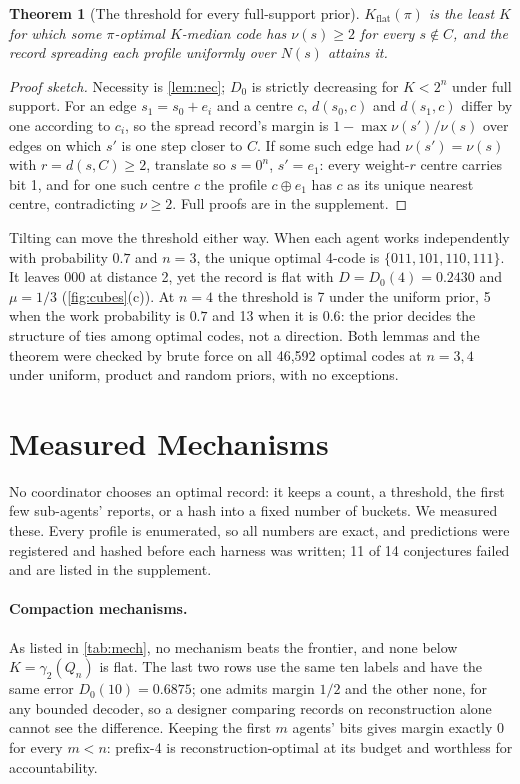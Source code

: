 \documentclass[sigconf,anonymous,acmthm=false]{acmart}
\theoremstyle{acmplain}
\newtheorem{theorem}{Theorem}
\theoremstyle{acmdefinition}
\newcommand{\Kflat}{K_{\mathrm{flat}}}
\begin{document}
\begin{theorem}[The threshold for every full-support prior]\label{thm:prior}
$\Kflat(\pi)$ is the least $K$ for which some $\pi$-optimal $K$-median code has $\nu(s)\ge2$
for every $s\notin C$, and the record spreading each profile uniformly over $N(s)$ attains it.
\end{theorem}
\begin{proof}[Proof sketch]
Necessity is \cref{lem:nec}; $D_0$ is strictly decreasing for $K<2^n$ under full support.
For an edge $s_1=s_0+e_i$ and a centre $c$, $d(s_0,c)$ and $d(s_1,c)$ differ by one according
to $c_i$, so the spread record's margin is $1-\max\nu(s')/\nu(s)$ over edges on which $s'$ is
one step closer to $C$. If some such edge had $\nu(s')=\nu(s)$ with $r=d(s,C)\ge2$, translate
so $s=0^n$, $s'=e_1$: every weight-$r$ centre carries bit 1, and for one such centre $c$ the
profile $c\oplus e_1$ has $c$ as its unique nearest centre, contradicting $\nu\ge2$. Full
proofs are in the supplement.
\end{proof}

Tilting can move the threshold either way. When each agent works independently with
probability $0.7$ and $n=3$, the unique optimal 4-code is $\{011,101,110,111\}$. It leaves
$000$ at distance 2, yet the record is flat with $D=D_0(4)=0.2430$ and $\mu=1/3$
(\cref{fig:cubes}(c)). At $n=4$ the threshold is 7 under the uniform prior, 5 when the
work probability is $0.7$ and 13 when it is $0.6$: the prior decides the structure of ties
among optimal codes, not a direction. Both lemmas and the theorem were checked by brute
force on all 46,592 optimal codes at $n=3,4$ under uniform, product and random priors, with
no exceptions.

\section{Measured Mechanisms}\label{sec:experiments}

No coordinator chooses an optimal record: it keeps a count, a threshold, the first few
sub-agents' reports, or a hash into a fixed number of buckets. We measured these. Every profile
is enumerated, so all numbers are exact, and predictions were registered and hashed before
each harness was written; 11 of 14 conjectures failed and are listed in the supplement.

\paragraph{Compaction mechanisms.} As listed in \cref{tab:mech}, no mechanism beats the
frontier, and none below $K=\gamma_2(Q_n)$ is flat. The last two rows use the same ten labels
and have the same error $D_0(10)=0.6875$; one admits margin $1/2$ and the other none, for any
bounded decoder, so a designer comparing records on reconstruction alone cannot see the
difference. Keeping the first $m$ agents' bits gives margin exactly 0 for every $m<n$: prefix-4
is reconstruction-optimal at its budget and worthless for accountability.
\end{document}
